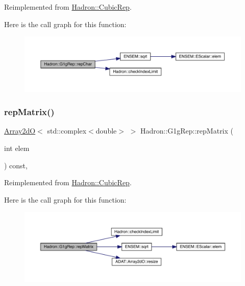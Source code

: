 Reimplemented from \mbox{\hyperlink{structHadron_1_1CubicRep_af45227106e8e715e84b0af69cd3b36f8}{Hadron\+::\+Cubic\+Rep}}.

Here is the call graph for this function\+:
\nopagebreak
\begin{figure}[H]
\begin{center}
\leavevmode
\includegraphics[width=350pt]{d4/d3c/structHadron_1_1G1gRep_aaf106033a828159337aed03c6489087f_cgraph}
\end{center}
\end{figure}
\mbox{\label{structHadron_1_1G1gRep_a0671004832091015635bb8565653340c}} 
\subsubsection{\texorpdfstring{repMatrix()}{repMatrix()}\hspace{0.1cm}{\footnotesize\ttfamily [1/3]}}
{\footnotesize\ttfamily \mbox{\hyperlink{classADAT_1_1Array2dO}{Array2dO}}$<$ std\+::complex$<$double$>$ $>$ Hadron\+::\+G1g\+Rep\+::rep\+Matrix (\begin{DoxyParamCaption}\item[{int}]{elem }\end{DoxyParamCaption}) const\hspace{0.3cm}{\ttfamily [inline]}, {\ttfamily [virtual]}}



Reimplemented from \mbox{\hyperlink{structHadron_1_1CubicRep_ac5d7e9e6f4ab1158b5fce3e4ad9e8005}{Hadron\+::\+Cubic\+Rep}}.

Here is the call graph for this function\+:
\nopagebreak
\begin{figure}[H]
\begin{center}
\leavevmode
\includegraphics[width=350pt]{d4/d3c/structHadron_1_1G1gRep_a0671004832091015635bb8565653340c_cgraph}
\end{center}
\end{figure}
\mbox{\label{structHadron_1_1G1gRep_a0671004832091015635bb8565653340c}} 
